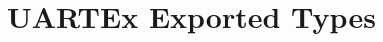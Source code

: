 \hypertarget{group___u_a_r_t_ex___exported___types}{}\section{U\+A\+R\+T\+Ex Exported Types}
\label{group___u_a_r_t_ex___exported___types}

